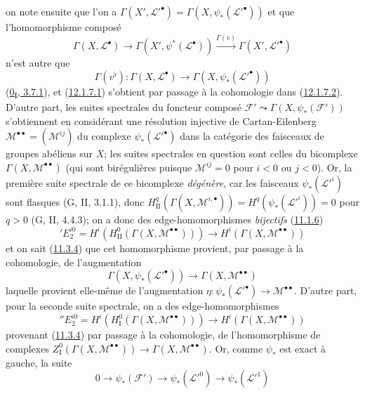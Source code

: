 on note ensuite que l'on a
$\Gamma(X',\mathcal L'^\bullet)=\Gamma(X,\psi_*(\mathcal L'^\bullet))$ et
que l'homomorphisme composé
\[
\Gamma(X,\mathcal L^\bullet)\longrightarrow
\Gamma(X',\psi^*(\mathcal L^\bullet))
\xrightarrow{\Gamma(v)}\Gamma(X',\mathcal L'^\bullet)
\]
n'est autre que
\[
\label{0.12.1.7.2-fr}
\tag{12.1.7.2}
\Gamma(v^\flat):\Gamma(X,\mathcal L^\bullet)
\longrightarrow\Gamma(X,\psi_*(\mathcal L'^\bullet))
\]
(\hyperref[0.3.7.1-fr]{0\textsubscript{I}, 3.7.1}), et
(\hyperref[0.12.1.7.1-fr]{12.1.7.1}) s'obtient par passage à la cohomologie
dans (\hyperref[0.12.1.7.2-fr]{12.1.7.2}). D'autre part, les suites spectrales
du foncteur composé $\mathcal F'\leadsto\Gamma(X,\psi_*(\mathcal F'))$
s'obtiennent en considérant une résolution injective de Cartan-Eilenberg
$\mathcal M^{\bullet\bullet}=(\mathcal M^{ij})$ du complexe
$\psi_*(\mathcal L'^\bullet)$ dans la catégorie des faisceaux de groupes
abéliens sur $X$; les suites spectrales en question sont celles du bicomplexe
$\Gamma(X,\mathcal M^{\bullet\bullet})$ (qui sont birégulières puisque
$\mathcal M^{ij}=0$ pour $i<0$ ou $j<0$). Or, la première suite spectrale de
ce bicomplexe \emph{dégénère}, car les faisceaux
$\psi_*(\mathcal L'^i)$ sont flasques (G, II, 3.1.1), donc
$H_{\mathrm{II}}^q(\Gamma(X,\mathcal M^{i,\bullet}))
=H^q(\psi_*(\mathcal L'^i))=0$ pour $q>0$ (G, II, 4.4.3); on a donc des
edge-homomorphismes \emph{bijectifs} (\hyperref[0.11.1.6-fr]{11.1.6})
\[
\label{0.12.1.7.3-fr}
\tag{12.1.7.3}
'E_2^{i0}=H^i(H_{\mathrm{II}}^0(\Gamma(X,\mathcal M^{\bullet\bullet})))
\longrightarrow H^i(\Gamma(X,\mathcal M^{\bullet\bullet}))
\]
et on sait (\hyperref[0.11.3.4-fr]{11.3.4}) que cet homomorphisme provient,
par passage à la cohomologie, de l'augmentation
\[
\label{0.12.1.7.4-fr}
\tag{12.1.7.4}
\Gamma(X,\psi_*(\mathcal L'^\bullet))
\longrightarrow\Gamma(X,\mathcal M^{\bullet\bullet})
\]
laquelle provient elle-même de l'augmentation
$\eta:\psi_*(\mathcal L'^\bullet)\to\mathcal M^{\bullet\bullet}$. D'autre
part, pour la seconde suite spectrale, on a des edge-homomorphismes
\[
\label{0.12.1.7.5-fr}
\tag{12.1.7.5}
''E_2^{i0}=H^i(H_{\mathrm I}^0(\Gamma(X,\mathcal M^{\bullet\bullet})))
\longrightarrow H^i(\Gamma(X,\mathcal M^{\bullet\bullet}))
\]
provenant (\hyperref[0.11.3.4-fr]{11.3.4}) par passage à la cohomologie, de
l'homomorphisme de complexes
$Z_{\mathrm I}^0(\Gamma(X,\mathcal M^{\bullet\bullet}))
\to\Gamma(X,\mathcal M^{\bullet\bullet})$. Or, comme $\psi_*$ est exact à
gauche, la suite
\[
0\longrightarrow\psi_*(\mathcal F')\longrightarrow
\psi_*(\mathcal L'^0)\longrightarrow\psi_*(\mathcal L'^1)
\]
